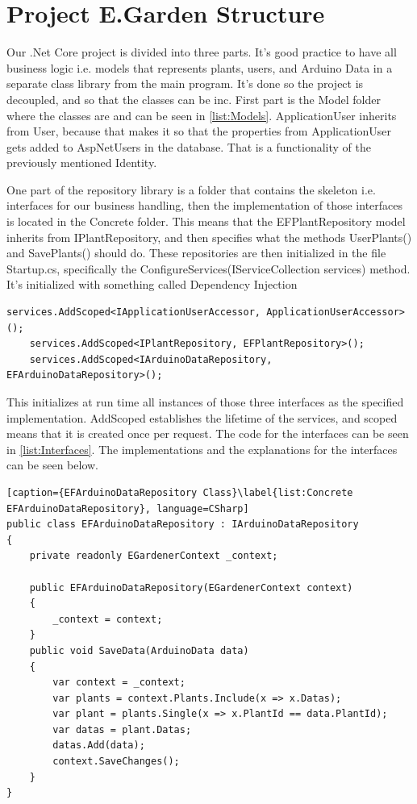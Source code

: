 \documentclass[a4paper,12pt,oneside,openright,titlepage]{book}
\begin{document}
\section{Project E.Garden Structure}
Our .Net Core project is divided into three parts. It's good practice to have all business logic i.e. models that represents plants, users, and Arduino Data in a separate class library from the main program. It's done so the project is decoupled, and so that the classes can be inc. First part is the Model folder where the classes are and can be seen in \ref{list:Models}. ApplicationUser inherits from User, because that makes it so that the properties from ApplicationUser gets added to AspNetUsers in the database. That is a functionality of the previously mentioned Identity. 


One part of the repository library is a folder that contains the skeleton i.e. interfaces for our business handling, then the implementation of those interfaces is located in the Concrete folder. This means that the EFPlantRepository model inherits from IPlantRepository, and then specifies what the methods UserPlants() and SavePlants() should do. These repositories are then initialized in the file Startup.cs, specifically the ConfigureServices(IServiceCollection services) method. It's initialized with something called Dependency Injection\cite{DependencyInjection}


\label{list:DpInjection}
\begin{lstlisting}[caption={Dependency Injection}, language=CSharp]
	services.AddScoped<IApplicationUserAccessor, ApplicationUserAccessor>();
	services.AddScoped<IPlantRepository, EFPlantRepository>();
    services.AddScoped<IArduinoDataRepository, EFArduinoDataRepository>();
\end{lstlisting}

This initializes at run time all instances of those three interfaces as the specified implementation. AddScoped establishes the lifetime of the services, and scoped means that it is created once per request. The code for the interfaces can be seen in \ref{list:Interfaces}. The implementations and the explanations for the interfaces can be seen below.

\begin{lstlisting}[caption={EFArduinoDataRepository Class}\label{list:Concrete EFArduinoDataRepository}, language=CSharp]
public class EFArduinoDataRepository : IArduinoDataRepository
{
	private readonly EGardenerContext _context;
        
	public EFArduinoDataRepository(EGardenerContext context)
	{
        _context = context;
	}
	public void SaveData(ArduinoData data)
	{
		var context = _context;
		var plants = context.Plants.Include(x => x.Datas);
	    var plant = plants.Single(x => x.PlantId == data.PlantId);
        var datas = plant.Datas;
        datas.Add(data);
		context.SaveChanges();
	}
}
\end{lstlisting}
\end{document}
